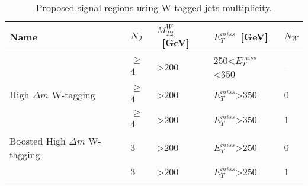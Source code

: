 \begin{table}[h]
\begin{center}
\begin{tabular}{|l|l|l|l|l|}
\hline
Name            & $N_{J}$  & $M_{T2}^{W}$~[GeV]            & $E_{T}^{miss}$~[GeV]    & $N_{W}$ \\
\hline
\hline
                          & $\geq$4  & >200                & 250<$E_{T}^{miss}$<350   & --   \\
High $\Delta m$ W-tagging & $\geq$4  & >200                & $E_{T}^{miss}$>350       & 0    \\
                          & $\geq$4  & >200                & $E_{T}^{miss}$>350       & 1    \\
\hline
Boosted High $\Delta m$ W-tagging & 3  & >200              & $E_{T}^{miss}$>250 & 0  \\
                                  & 3  & >200              & $E_{T}^{miss}$>250 & 1  \\
\hline
\end{tabular}
\caption[Table caption text]{ Proposed signal regions using W-tagged jets multiplicity. }
\label{tab:SRW}
\end{center}
\end{table}

